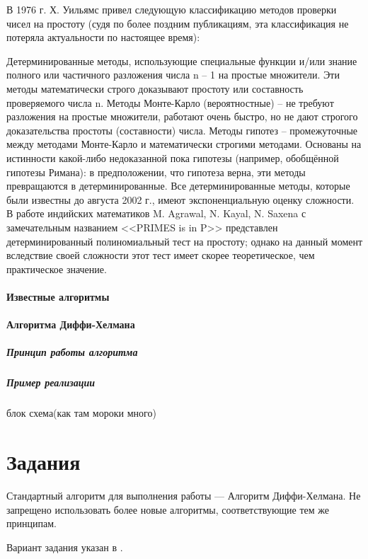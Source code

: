 В 1976 г. Х. Уильямс привел следующую классификацию методов проверки чисел на
простоту (судя по более поздним публикациям, эта классификация не потеряла
актуальности по настоящее время):

Детерминированные методы, использующие специальные функции и/или знание
полного или частичного разложения числа n – 1 на простые множители. Эти
методы математически строго доказывают простоту или составность проверяемого
числа n. Методы Монте-Карло (вероятностные) – не требуют разложения на
простые множители, работают очень быстро, но не дают строгого доказательства
простоты (составности) числа. Методы гипотез – промежуточные между методами
Монте-Карло и математически строгими методами. Основаны на истинности
какой-либо недоказанной пока гипотезы (например, обобщённой гипотезы Римана):
в предположении, что гипотеза верна, эти методы превращаются в
детерминированные. Все детерминированные методы, которые были известны до
августа 2002 г., имеют экспоненциальную оценку сложности. В работе индийских
математиков M. Agrawal, N. Kayal, N. Saxena с замечательным названием
<<PRIMES is in P>> представлен детерминированный полиномиальный тест на
простоту; однако на данный момент вследствие своей сложности этот тест имеет
скорее теоретическое, чем практическое значение.

\paragraph{Известные алгоритмы}
%

\paragraph{Алгоритма Диффи-Хелмана}
%

\subparagraph{Принцип работы алгоритма}


\subparagraph{Пример реализации} блок схема(как там мороки много)

\section{Задания}\label{sect2_b}
%
Стандартный алгоритм для выполнения работы --- Алгоритм Диффи-Хелмана. Не
запрещено использовать более новые алгоритмы, соответствующие тем же
принципам.

Вариант задания указан в .

